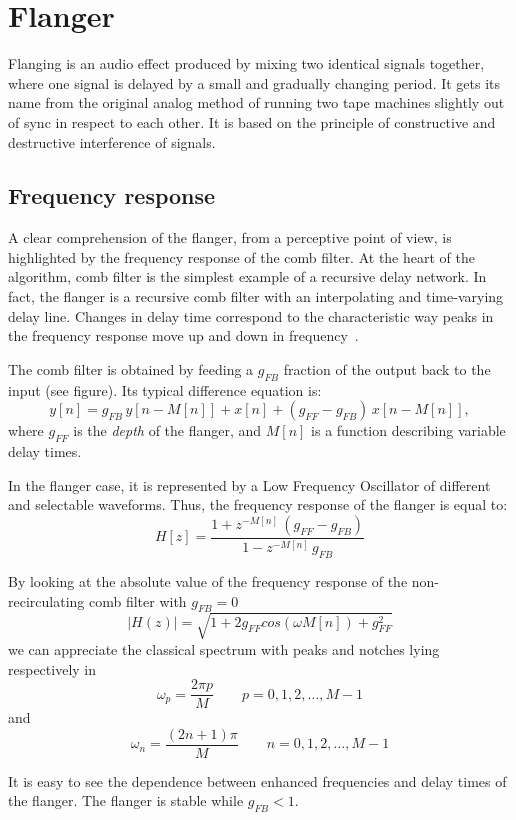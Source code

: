 \section{Flanger}

Flanging is an audio effect produced by mixing two identical signals together, where one signal is delayed by a small and gradually changing period.
It gets its name from the original analog method of running two tape machines slightly out of sync in respect to each other.
It is based on the principle of constructive and destructive interference of signals.

\subsection{Frequency response}\label{sec:combfilt}

A clear comprehension of the flanger, from a perceptive point of view, is highlighted by the frequency response of the comb filter.
At the heart of the algorithm, comb filter is the simplest example of a recursive delay network.
In fact, the flanger is a recursive comb filter with an interpolating and time-varying delay line.
Changes in delay time correspond to the characteristic way peaks in the frequency response move up and down in frequency~\cite{puckette2006theory}.

The comb filter is obtained by feeding a $g_{FB}$ fraction of the output back to the input (see figure). Its typical difference equation is:
\[
y[n] = g_{FB} \, y[n - M[n]] + x[n] + (g_{FF} - g_{FB}) \, x[n - M[n]],
\]
where $g_{FF}$ is the \emph{depth} of the flanger, and $M[n]$ is a function describing variable delay times.

In the flanger case, it is represented by a Low Frequency Oscillator of different and selectable waveforms. Thus, the frequency response of the flanger is equal to:
\[
	H[z] = \frac{1 + z^{
			-M[n]} \, \left( g_{FF} - g_{FB} \right)
	}{
		1 - z^{-M[n]} \, g_{FB}
	}
\]

By looking at the absolute value of the frequency response of the non-recirculating comb filter with $g_{FB} = 0$
\[
|H(z)| = \sqrt{ 1 + 2g_{FF} cos(\omega M[n]) + g_{FF}^2}
\]
we can appreciate the classical spectrum with peaks and notches lying respectively in 
\[
\omega_p = \frac{2 \pi p}{M} \qquad  p = 0, 1, 2, \dots, M-1
\]
and 
\[
\omega_n = \frac{(2n+1) \pi}{M} \qquad n = 0, 1, 2, \dots, M-1
\]

It is easy to see the dependence between enhanced frequencies and delay times of the flanger. The flanger is stable while $g_{FB} < 1$.

